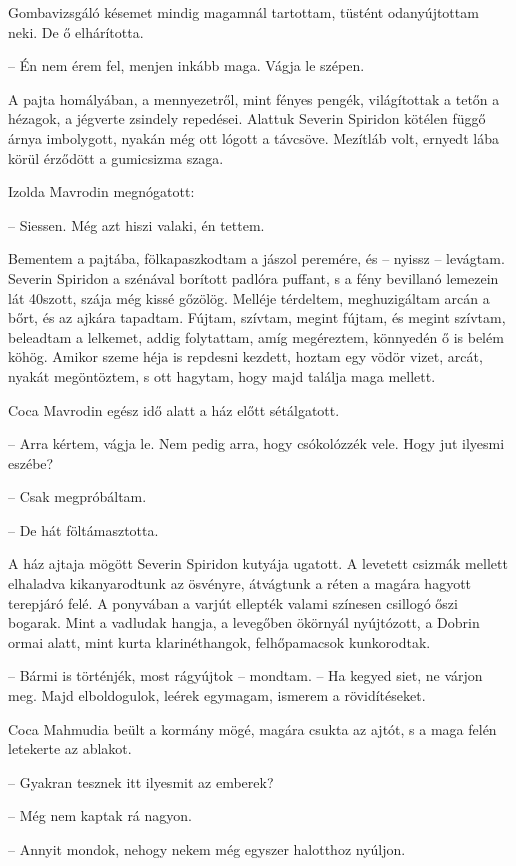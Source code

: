 \documentclass{IEEEtran}
\begin{document}
Gombavizsgáló késemet mindig magamnál tartottam, tüstént odanyújtottam neki.
De ő elhárította.

– Én nem érem fel, menjen inkább maga. Vágja le szépen.

A pajta homályában, a mennyezetről, mint fényes pengék, világítottak a tetőn a
hézagok, a jégverte zsindely repedései. Alattuk Severin Spiridon kötélen függő
árnya imbolygott, nyakán még ott lógott a távcsöve. Mezítláb volt, ernyedt
lába körül érződött a gumicsizma szaga.

Izolda Mavrodin megnógatott:

– Siessen. Még azt hiszi valaki, én tettem.

Bementem a pajtába, fölkapaszkodtam a jászol peremére, és – nyissz – levágtam.
Severin Spiridon a szénával borított padlóra puffant, s a fény bevillanó
lemezein lát 40szott, szája még kissé gőzölög. Melléje térdeltem,
meghuzigáltam arcán a bőrt, és az ajkára tapadtam. Fújtam, szívtam, megint
fújtam, és megint szívtam, beleadtam a lelkemet, addig folytattam, amíg
megéreztem, könnyedén ő is belém köhög. Amikor szeme héja is repdesni kezdett,
hoztam egy vödör vizet, arcát, nyakát megöntöztem, s ott hagytam, hogy majd
találja maga mellett.

Coca Mavrodin egész idő alatt a ház előtt sétálgatott.

– Arra kértem, vágja le. Nem pedig arra, hogy csókolózzék vele. Hogy jut
ilyesmi eszébe?

– Csak megpróbáltam.

– De hát föltámasztotta.

A ház ajtaja mögött Severin Spiridon kutyája ugatott. A levetett csizmák
mellett elhaladva kikanyarodtunk az ösvényre, átvágtunk a réten a magára
hagyott terepjáró felé. A ponyvában a varjút ellepték valami színesen csillogó
őszi bogarak. Mint a vadludak hangja, a levegőben ökörnyál nyújtózott, a
Dobrin ormai alatt, mint kurta klarinéthangok, felhőpamacsok kunkorodtak.

– Bármi is történjék, most rágyújtok – mondtam. – Ha kegyed siet, ne várjon
meg. Majd elboldogulok, leérek egymagam, ismerem a rövidítéseket.

Coca Mahmudia beült a kormány mögé, magára csukta az ajtót, s a maga felén
letekerte az ablakot.

– Gyakran tesznek itt ilyesmit az emberek?

– Még nem kaptak rá nagyon.

– Annyit mondok, nehogy nekem még egyszer halotthoz nyúljon.
\end{document}
